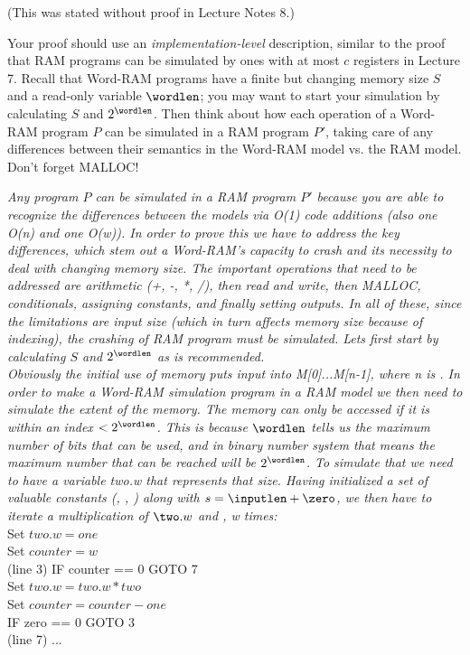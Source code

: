 \documentclass[11pt]{article}
\begin{document}
\begin{enumerate}
\begin{enumerate}
(This was stated without proof in Lecture Notes 8.) 

\end{enumerate}

Your proof should use an {\em implementation-level} description, similar to the proof that RAM programs can be simulated by ones with at most $c$ registers in Lecture 7.  Recall that Word-RAM programs have a finite but changing memory size $S$ and a read-only variable $\wordlen$; you may want to start your simulation by calculating $S$ and $2^{\wordlen}$.  Then think about how each operation of a Word-RAM program $P$ can be simulated in a RAM program $P'$, taking care of any differences between their semantics in the Word-RAM model vs. the RAM model. Don't forget MALLOC!

\textit{
Any program $P$ can be simulated in a RAM program $P'$ because you are able to recognize the differences between the models via O(1) code additions (also one O(n) and one O(w)). In order to prove this we have to address the key differences, which stem out a Word-RAM's capacity to crash and its necessity to deal with changing memory size. The important operations that need to be addressed are arithmetic (+, -, *, /), then read and write, then MALLOC, conditionals, assigning constants, and finally setting outputs. In all of these, since the limitations are input size (which in turn affects memory size because of indexing), the crashing of RAM program must be simulated. Lets first start by calculating $S$  and $2^{\wordlen}$ as is recommended.
\\
Obviously the initial use of memory puts input into M[0]...M[n-1], where n is . In order to make a Word-RAM simulation program in a RAM model we then need to simulate the extent of the memory. The memory can only be accessed if it is within an index $< 2^{\wordlen}$. This is because $\wordlen$ tells us the maximum number of bits that can be used, and in binary number system that means the maximum number that can be reached will be $2^{\wordlen}$. To simulate that we need to have a variable two.w that represents that size. Having initialized a set of valuable constants (\zero, \one, \two) along with $s = \inputlen + \zero$, we then have to iterate a multiplication of $\two.w$ and \two, w times:}
\\Set $two.w =one$
\\Set $counter = w$
\\(line 3) IF counter == 0 GOTO 7
\\Set $two.w = two.w * two$
\\Set $counter = counter - one$
\\IF zero == 0 GOTO 3
\\ (line 7) ... 


\end{enumerate}
\end{document}
